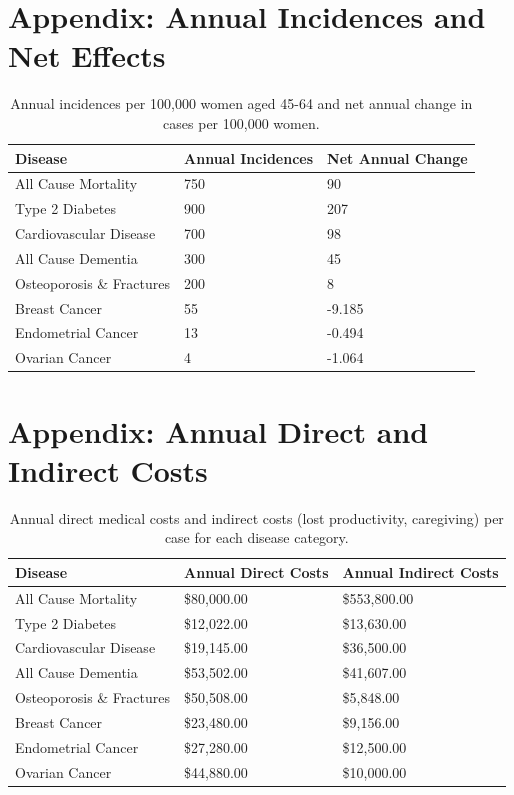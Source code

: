 \documentclass[12pt]{article}
\begin{document}
\section*{Appendix: Annual Incidences and Net Effects}
\begin{table}[h]
\centering
\begin{tabular}{|p{5cm}|p{4cm}|p{4cm}|}
\hline
\textbf{Disease} & \textbf{Annual Incidences} & \textbf{Net Annual Change} \\
\hline
All Cause Mortality & 750 & 90 \\
\hline
Type 2 Diabetes & 900 & 207 \\
\hline
Cardiovascular Disease & 700 & 98 \\
\hline
All Cause Dementia & 300 & 45 \\
\hline
Osteoporosis \& Fractures & 200 & 8 \\
\hline
Breast Cancer & 55 & -9.185 \\
\hline
Endometrial Cancer & 13 & -0.494 \\
\hline
Ovarian Cancer & 4 & -1.064 \\
\hline
\end{tabular}
\caption{Annual incidences per 100,000 women aged 45-64 and net annual change in cases per 100,000 women.}
\label{tab:incidences}
\end{table}

\section*{Appendix: Annual Direct and Indirect Costs}
\begin{table}[h]
\centering
\begin{tabular}{|p{5cm}|p{4cm}|p{4cm}|}
\hline
\textbf{Disease} & \textbf{Annual Direct Costs} & \textbf{Annual Indirect Costs} \\
\hline
All Cause Mortality & \$80,000.00 & \$553,800.00 \\
\hline
Type 2 Diabetes & \$12,022.00 & \$13,630.00 \\
\hline
Cardiovascular Disease & \$19,145.00 & \$36,500.00 \\
\hline

All Cause Dementia & \$53,502.00 & \$41,607.00 \\
\hline
Osteoporosis \& Fractures & \$50,508.00 & \$5,848.00 \\
\hline
Breast Cancer & \$23,480.00 & \$9,156.00 \\
\hline
Endometrial Cancer & \$27,280.00 & \$12,500.00 \\
\hline
Ovarian Cancer & \$44,880.00 & \$10,000.00 \\
\hline

\end{tabular}
\caption{Annual direct medical costs and indirect costs (lost productivity, caregiving) per case for each disease category.}
\label{tab:costs}
\end{table}
\end{document}
